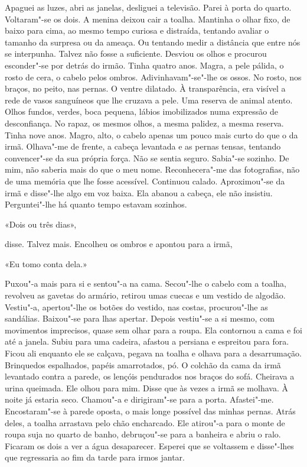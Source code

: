 Apaguei as luzes, abri as janelas, desliguei a televisão. Parei à porta
do quarto. Voltaram"-se os dois. A menina deixou cair a toalha. Mantinha
o olhar fixo, de baixo para cima, ao mesmo tempo curiosa e distraída,
tentando avaliar o tamanho da surpresa ou da ameaça. Ou tentando medir a
distância que entre nós se interpunha. Talvez não fosse a suficiente.
Desviou os olhos e procurou esconder"-se por detrás do irmão. Tinha
quatro anos. Magra, a pele pálida, o rosto de cera, o cabelo pelos
ombros. Adivinhavam"-se"-lhe os ossos. No rosto, nos braços, no peito,
nas pernas. O ventre dilatado. À transparência, era visível a rede de
vasos sanguíneos que lhe cruzava a pele. Uma reserva de animal atento.
Olhos fundos, verdes, boca pequena, lábios imobilizados numa expressão
de desconfiança. No rapaz, os mesmos olhos, a mesma palidez, a mesma
reserva. Tinha nove anos. Magro, alto, o cabelo apenas um pouco mais
curto do que o da irmã. Olhava"-me de frente, a cabeça levantada e as
pernas tensas, tentando convencer"-se da sua própria força. Não se
sentia seguro. Sabia"-se sozinho. De mim, não saberia mais do que o meu
nome. Reconhecera"-me das fotografias, não de uma memória que lhe fosse
acessível. Continuou calado. Aproximou"-se da irmã e disse"-lhe algo em
voz baixa. Ela abanou a cabeça, ele não insistiu. Perguntei"-lhe há
quanto tempo estavam sozinhos.

«Dois ou três dias»,

disse. Talvez mais. Encolheu os ombros e apontou para a irmã,

«Eu tomo conta dela.»

Puxou"-a mais para si e sentou"-a na cama. Secou"-lhe o cabelo com a
toalha, revolveu as gavetas do armário, retirou umas cuecas e um vestido
de algodão. Vestiu"-a, apertou"-lhe os botões do vestido, nas costas,
procurou"-lhe as sandálias. Baixou"-se para lhas apertar. Depois
vestiu"-se a si mesmo, com movimentos imprecisos, quase sem olhar para a
roupa. Ela contornou a cama e foi até a janela. Subiu para uma cadeira,
afastou a persiana e espreitou para fora. Ficou ali enquanto ele se
calçava, pegava na toalha e olhava para a desarrumação. Brinquedos
espalhados, papéis amarrotados, pó. O colchão da cama da irmã levantado
contra a parede, os lençóis pendurados nos braços do sofá. Cheirava a
urina queimada. Ele olhou para mim. Disse que às vezes a irmã se
molhava. À noite já estaria seco. Chamou"-a e dirigiram"-se para a
porta. Afastei"-me. Encostaram"-se à parede oposta, o mais longe
possível das minhas pernas. Atrás deles, a toalha arrastava pelo chão
encharcado. Ele atirou"-a para o monte de roupa suja no quarto de banho,
debruçou"-se para a banheira e abriu o ralo. Ficaram os dois a ver a
água desaparecer. Esperei que se voltassem e disse"-lhes que regressaria
ao fim da tarde para irmos jantar.

